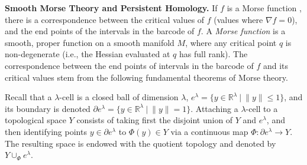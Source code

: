 \documentclass[11pt]{article}
\newcommand{\R}{\mathbb{R}}
\newcommand{\bord}{\partial}
\newcommand{\union}{\cup}
\theoremstyle{plain}
\theoremstyle{definition}
\theoremstyle{remark}
\begin{document}
	
	\textbf{Smooth Morse Theory and Persistent Homology.}
	If $f$ is a Morse function \citep{milnor_morse_1963}, there is a correspondence between the critical values of $f$ (values where $\nabla f = 0$), and the end points of the intervals in the barcode of $f$. A \textit{Morse function} is a smooth, proper function on a smooth manifold $M$, where any critical point $q$ is non-degenerate (i.e., the Hessian evaluated at $q$ has full rank). The correspondence between the end points of intervals in the barcode of $f$ and its critical values stem from the following fundamental theorems of Morse theory.
	
	
	Recall that a $\lambda$-cell is a closed ball of dimension $\lambda$,
	$e^\lambda = \{y \in \R^\lambda ~|~ \|y\| \leq 1 \}$,
	and its boundary is denoted $\bord e^\lambda = \{y \in \R^\lambda ~|~ \|y\| = 1 \}$.
	Attaching a $\lambda$-cell to a topological space $Y$ consists of taking first the disjoint union of $Y$ and $e^\lambda$, and then identifying points $y \in \bord e^\lambda$ to $\Phi(y) \in Y$ via a continuous map $\Phi : \bord e^\lambda \to Y$. The resulting space is endowed with the quotient topology and denoted by $Y \union_\Phi e^\lambda$.
	
\end{document}
